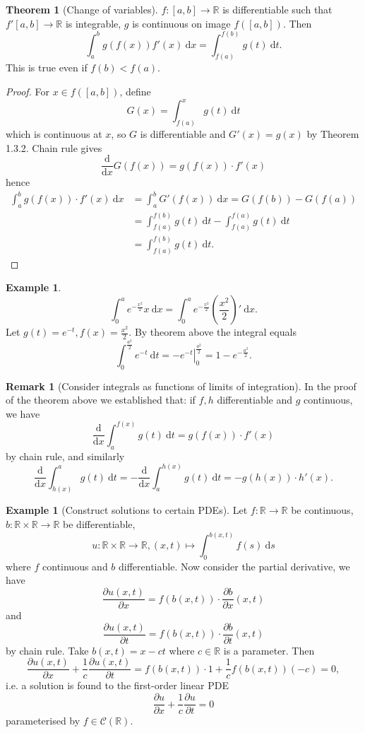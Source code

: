 \documentclass[a4paper]{article}
\theoremstyle{definition}
\newtheorem{thm}[defn]{Theorem}
\newtheorem{example}[defn]{Example}
\newtheorem*{remark}{Remark}
\begin{document}
\begin{thm}[Change of variables]
$f:[a,b]\rightarrow \mathbb R$ is differentiable such that $f'[a,b]\rightarrow \mathbb R$ is integrable, $g$ is continuous on image $f([a,b])$. Then
\[
\int_a^b g(f(x))f'(x) \ \mathrm d x = \int_{f(a)}^{f(b)}g(t) \ \mathrm d t .
\]
This is true even if $f(b)<f(a)$.
\end{thm}
\begin{proof}
For $x\in f([a,b])$, define
\[
G(x)=\int_{f(a)}^x g(t) \ \mathrm d t
\]
which is continuous at $x$, so $G$ is differentiable and $G'(x)=g(x)$ by Theorem 1.3.2. Chain rule gives
\[
\frac{\mathrm d}{\mathrm d x}G(f(x))=g(f(x))\cdot f'(x)
\]
hence
\[
\begin{aligned}
    \int_a^b g(f(x))\cdot f'(x) \ \mathrm d x &= \int_a^b G'(f(x)) \ \mathrm d x = G(f(b))-G(f(a)) \\ &= \int_{f(a)}^{f(b)} g(t) \ \mathrm d t - \int_{f(a)}^{f(a)} g(t) \ \mathrm d t \\ &= \int_{f(a)}^{f(b)} g(t) \ \mathrm d t .
\end{aligned}
\]
\end{proof}
\begin{example}
\[
\int_0^a e^{-\frac{x^2}{2}} x \ \mathrm d x=\int_0^a e^{-\frac{x^2}{2}} \left(\frac{x^2}{2}\right)' \ \mathrm d x .
\]
Let $g(t)=e^{-t},f(x)=\frac{x^2}{2}$. By theorem above the integral equals
\[
\int_0^{\frac{a^2}{2}} e^{-t} \ \mathrm d t=\left.-e^{-t}\right|_0^{\frac{a^2}{2}} = 1-e^{-\frac{a^2}{2}} .
\]
\end{example}
\begin{remark}[Consider integrals as functions of limits of integration]
In the proof of the theorem above we established that: if $f,h$ differentiable and $g$ continuous, we have
\[
\frac{\mathrm d}{\mathrm d x} \int_a^{f(x)}g(t) \ \mathrm d t=g(f(x))\cdot f'(x)
\]
by chain rule, and similarly
\[
\frac{\mathrm d}{\mathrm d x} \int_{h(x)}^a g(t) \ \mathrm d t=-\frac{\mathrm d}{\mathrm d x} \int_a^{h(x)} g(t) \ \mathrm d t=-g(h(x))\cdot h'(x).
\]
\end{remark}
\begin{example}[Construct solutions to certain PDEs]
Let $f:\mathbb R \rightarrow \mathbb R$ be continuous, $b:\mathbb R \times \mathbb R \rightarrow \mathbb R$ be differentiable, 
\[
u:\mathbb R\times \mathbb R \rightarrow \mathbb R, (x,t)\mapsto \int_{0}^{b(x,t)} f(s) \ \mathrm d s
\]
where $f$ continuous and $b$ differentiable. Now consider the partial derivative, we have
\[
\frac{\partial u(x,t)}{\partial x}=f(b(x,t))\cdot \frac{\partial b}{\partial x}(x,t)
\]
and
\[
\frac{\partial u(x,t)}{\partial t}=f(b(x,t))\cdot \frac{\partial b}{\partial t}(x,t)
\]
by chain rule. Take $b(x,t)=x-ct$ where $c\in \mathbb R$ is a parameter. Then
\[
\frac{\partial u(x,t)}{\partial x}+\frac1c \frac{\partial u(x,t)}{\partial t}=f(b(x,t))\cdot 1+\frac1c f(b(x,t))(-c)=0 ,
\]
i.e. a solution is found to the first-order linear PDE
\[
\frac{\partial u}{\partial x}+\frac1c \frac{\partial u}{\partial t}=0
\]
parameterised by $f\in \mathcal C(\mathbb R)$.
\end{example}
\end{document}
